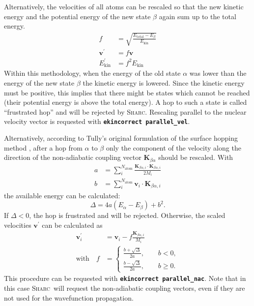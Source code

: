 \documentclass[a4paper,11pt,DIV=15,openany,twoside=false]{scrbook}
\newcommand{\sharc}{\textsc{Sharc}}
\newcommand{\ttt}[1]{\textbf{\texttt{#1}}}
\newcommand{\VEC}[1]{\ensuremath{\mathbf{#1}}}
\begin{document}
Alternatively, the velocities of all atoms can be rescaled so that the new kinetic energy and the potential energy of the new state $\beta$ again sum up to the total energy.
\begin{align}
  f&=\sqrt{\frac{E_{\text{total}}-E_\beta}{E_{\text{kin}}}}\\
  \VEC{v}^\prime&=f\VEC{v}\\
  E_{\text{kin}}^\prime&=f^2E_{\text{kin}}
\end{align}
Within this methodology, when the energy of the old state $\alpha$ was lower than the energy of the new state $\beta$ the kinetic energy is lowered. Since the kinetic energy must be positive, this implies that there might be states which cannot be reached (their potential energy is above the total energy). A hop to such a state is called ``frustrated hop'' and will be rejected by \sharc. Rescaling parallel to the nuclear velocity vector is requested with \ttt{ekincorrect parallel\_vel}.

Alternatively, according to Tully's original formulation of the surface hopping method \cite{Tully1990JCP}, after a hop from $\alpha$ to $\beta$ only the component of the velocity along the direction of the non-adiabatic coupling vector $\VEC{K}_{\beta\alpha}$ should be rescaled. With
\begin{align}
  a&=\sum\limits_i^{N_\mathrm{atom}} \frac{\VEC{K}_{\beta\alpha, i}\cdot\VEC{K}_{\beta\alpha, i}}{2M_i}\\
  b&=\sum\limits_i^{N_\mathrm{atom}} \VEC{v}_{i}\cdot\VEC{K}_{\beta\alpha, i}
\end{align}
the available energy can be calculated:
\begin{equation}
  \Delta=
  4a
  \left(
    E_\alpha-E_\beta
  \right)+b^2.
\end{equation}
If $\Delta<0$, the hop is frustrated and will be rejected. Otherwise, the scaled velocities $\VEC{v}^\prime$ can be calculated as
\begin{align}
  \VEC{v}_i^\prime&=\VEC{v}_i-f\frac{\VEC{K}_{\beta\alpha, i}}{M_i}\\
  \mathrm{with}\quad f&=
  \begin{cases}
    \frac{b+\sqrt{\Delta}}{2a},\qquad b<0,\\
    \frac{b-\sqrt{\Delta}}{2a},\qquad b\geq 0.
  \end{cases}
\end{align}
This procedure can be requested with \ttt{ekincorrect parallel\_nac}. Note that in this case \sharc\ will request the non-adiabatic coupling vectors, even if they are not used for the wavefunction propagation.
\end{document}
